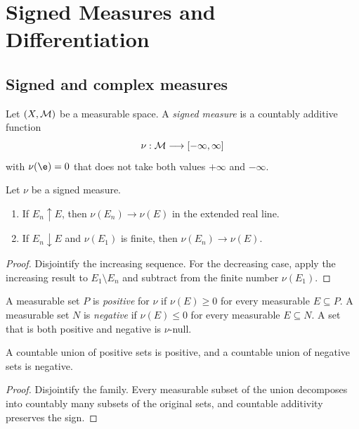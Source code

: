 \chapter{Signed Measures and Differentiation}

\section{Signed and complex measures}

\begin{de}
Let $(X,\mathcal{M})$ be a measurable space. A \emph{signed measure} is a countably additive function
\[
\nu:\mathcal{M}\longrightarrow[-\infty,\infty]
\]
with $\nu(\e)=0$ that does not take both values $+\infty$ and $-\infty$.
\end{de}

\begin{prop}[Continuity]
Let $\nu$ be a signed measure.
\begin{enumerate}
  \item If $E_n\uparrow E$, then $\nu(E_n)\to\nu(E)$ in the extended real line.
  \item If $E_n\downarrow E$ and $\nu(E_1)$ is finite, then $\nu(E_n)\to\nu(E)$.
\end{enumerate}
\end{prop}

\begin{proof}
Disjointify the increasing sequence. For the decreasing case, apply the increasing result to $E_1\setminus E_n$ and subtract from the finite number $\nu(E_1)$.
\end{proof}

\begin{de}
A measurable set $P$ is \emph{positive} for $\nu$ if $\nu(E)\geq0$ for every measurable $E\subseteq P$. A measurable set $N$ is \emph{negative} if $\nu(E)\leq0$ for every measurable $E\subseteq N$. A set that is both positive and negative is $\nu$-null.
\end{de}

\begin{lem}
A countable union of positive sets is positive, and a countable union of negative sets is negative.
\end{lem}

\begin{proof}
Disjointify the family. Every measurable subset of the union decomposes into countably many subsets of the original sets, and countable additivity preserves the sign.
\end{proof}

